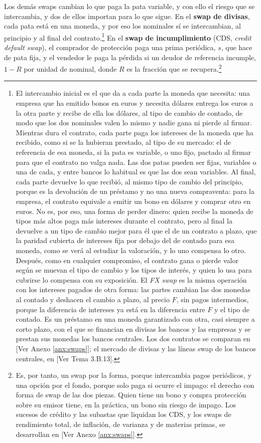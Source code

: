 \documentclass[10pt,a4paper]{article}
\newcommand{\authorfont}[1]{{\fontfamily{EBGaramond-TLF}\selectfont #1}}
\begin{document}
Los demás swaps cambian lo que paga la pata variable, y con ello el riesgo que se intercambia, y dos de ellos importan para lo que sigue. En el \textbf{swap de divisas}, cada pata está en una moneda, y por eso los nominales sí se intercambian, al principio y al final del contrato.\footnote{%
    El intercambio inicial es el que da a cada parte la moneda que necesita: una empresa que ha emitido bonos en euros y necesita dólares entrega los euros a la otra parte y recibe de ella los dólares, al tipo de cambio de contado, de modo que los dos nominales valen lo mismo y nadie gana ni pierde al firmar. Mientras dura el contrato, cada parte paga los intereses de la moneda que ha recibido, como si se la hubieran prestado, al tipo de su mercado: el de referencia de esa moneda, si la pata es variable, o uno fijo, pactado al firmar para que el contrato no valga nada. Las dos patas pueden ser fijas, variables o una de cada, y entre bancos lo habitual es que las dos sean variables. Al final, cada parte devuelve lo que recibió, al mismo tipo de cambio del principio, porque es la devolución de un préstamo y no una nueva compraventa: para la empresa, el contrato equivale a emitir un bono en dólares y comprar otro en euros. No es, por eso, una forma de perder dinero: quien recibe la moneda de tipos más altos paga más intereses durante el contrato, pero al final la devuelve a un tipo de cambio mejor para él que el de un contrato a plazo, que la paridad cubierta de intereses fija por debajo del de contado para esa moneda, como se verá al estudiar la valoración, y lo uno compensa lo otro. Después, como en cualquier compromiso, el contrato gana o pierde valor según se muevan el tipo de cambio y los tipos de interés, y quien lo usa para cubrirse lo compensa con su exposición. El \textit{FX swap} es la misma operación con los intereses pagados de otra forma: las partes cambian las dos monedas al contado y deshacen el cambio a plazo, al precio $F$, sin pagos intermedios, porque la diferencia de intereses ya está en la diferencia entre $F$ y el tipo de contado. Es un préstamo en una moneda garantizado con otra, casi siempre a corto plazo, con el que se financian en divisas los bancos y las empresas y se prestan sus monedas los bancos centrales. Los dos contratos se comparan en [\authorfont{Ver Anexo \ref{anx:swaps}}]; el mercado de divisas y las líneas swap de los bancos centrales, en [\authorfont{Ver Tema 3.B.13}].
} En el \textbf{swap de incumplimiento} (CDS, \textit{credit default swap}), el comprador de protección paga una prima periódica, $s$, que hace de pata fija, y el vendedor le paga la pérdida si un deudor de referencia incumple, $1-R$ por unidad de nominal, donde $R$ es la fracción que se recupera.\footnote{%
    Es, por tanto, un swap por la forma, porque intercambia pagos periódicos, y una opción por el fondo, porque solo paga si ocurre el impago: el derecho con forma de swap de las dos piezas. Quien tiene un bono y compra protección sobre su emisor tiene, en la práctica, un bono sin riesgo de impago. Los sucesos de crédito y las subastas que liquidan los CDS, y los swaps de rendimiento total, de inflación, de varianza y de materias primas, se desarrollan en [\authorfont{Ver Anexo \ref{anx:swaps}}].
}
\end{document}
